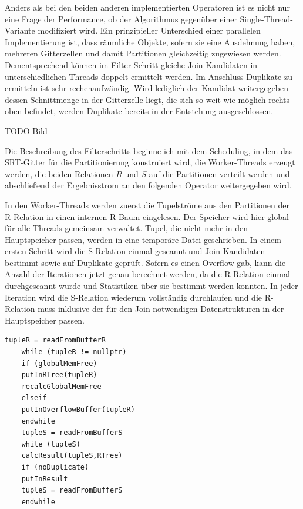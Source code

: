 \documentclass[a4paper,12pt,twoside]{article}
\begin{document}
{Anders als bei den beiden anderen implementierten Operatoren ist es nicht nur eine Frage der Performance, ob der Algorithmus gegenüber einer Single-Thread-Variante modifiziert wird. Ein prinzipieller Unterschied einer parallelen Implementierung ist, dass räumliche Objekte, sofern sie eine Ausdehnung haben, mehreren Gitterzellen und damit Partitionen gleichzeitig zugewiesen werden. Dementsprechend können im Filter-Schritt gleiche Join-Kandidaten in unterschiedlichen Threads doppelt ermittelt werden. Im Anschluss Duplikate zu ermitteln ist sehr rechenaufwändig. Wird lediglich der Kandidat weitergegeben dessen Schnittmenge in der Gitterzelle liegt, die sich so weit wie möglich rechts-oben befindet, werden Duplikate bereits in der Entstehung ausgeschlossen.

TODO Bild

Die Beschreibung des Filterschritts beginne ich mit dem Scheduling, in dem das SRT-Gitter für die Partitionierung konstruiert wird, die Worker-Threads erzeugt werden, die beiden Relationen $R$ und $S$ auf die Partitionen verteilt werden und abschließend der Ergebnisstrom an den folgenden Operator weitergegeben wird.

In den Worker-Threads werden zuerst die Tupelströme aus den Partitionen der R-Relation in einen internen R-Baum eingelesen. Der Speicher wird hier global für alle Threads gemeinsam verwaltet. Tupel, die nicht mehr in den Hauptspeicher passen, werden in eine temporäre Datei geschrieben. In einem ersten Schritt wird die S-Relation einmal gescannt und Join-Kandidaten bestimmt sowie auf Duplikate geprüft.  Sofern es einen Overflow gab, kann die Anzahl der Iterationen jetzt genau berechnet werden, da die R-Relation einmal durchgescannt wurde und Statistiken über sie bestimmt werden konnten. In jeder Iteration wird die S-Relation wiederum vollständig durchlaufen und die R-Relation muss inklusive der für den Join notwendigen Datenstrukturen in der Hauptspeicher passen.

\begin{minipage}{\linewidth}
	\begin{lstlisting}[caption={Spatial Join: Worker}, label=list:spatialJoin]
	tupleR = readFromBufferR 
	while (tupleR != nullptr)
	if (globalMemFree)
	putInRTree(tupleR)
	recalcGlobalMemFree
	elseif
	putInOverflowBuffer(tupleR)
	endwhile
	tupleS = readFromBufferS
	while (tupleS)
	calcResult(tupleS,RTree)
	if (noDuplicate)
	putInResult
	tupleS = readFromBufferS
	endwhile
	\end{lstlisting}
\end{minipage}

}
\end{document}

